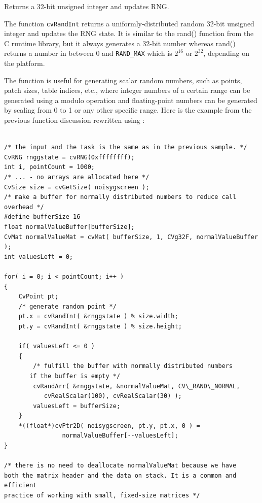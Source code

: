 \label{RandInt}

Returns a 32-bit unsigned integer and updates RNG.


\begin{description}
\end{description}

The function \texttt{cvRandInt} returns a uniformly-distributed random
32-bit unsigned integer and updates the RNG state. It is similar to the rand()
function from the C runtime library, but it always generates a 32-bit number
whereas rand() returns a number in between 0 and \texttt{RAND\_MAX}
which is $2^{16}$ or $2^{32}$, depending on the platform.

The function is useful for generating scalar random numbers, such as
points, patch sizes, table indices, etc., where integer numbers of a certain
range can be generated using a modulo operation and floating-point numbers
can be generated by scaling from 0 to 1 or any other specific range. Here
is the example from the previous function discussion rewritten using
:

\begin{lstlisting}

/* the input and the task is the same as in the previous sample. */
CvRNG rnggstate = cvRNG(0xffffffff);
int i, pointCount = 1000;
/* ... - no arrays are allocated here */
CvSize size = cvGetSize( noisygscreen );
/* make a buffer for normally distributed numbers to reduce call overhead */
#define bufferSize 16
float normalValueBuffer[bufferSize];
CvMat normalValueMat = cvMat( bufferSize, 1, CVg32F, normalValueBuffer );
int valuesLeft = 0;

for( i = 0; i < pointCount; i++ )
{
    CvPoint pt;
    /* generate random point */
    pt.x = cvRandInt( &rnggstate ) % size.width;
    pt.y = cvRandInt( &rnggstate ) % size.height;

    if( valuesLeft <= 0 )
    {
        /* fulfill the buffer with normally distributed numbers 
	   if the buffer is empty */
        cvRandArr( &rnggstate, &normalValueMat, CV\_RAND\_NORMAL, 
		   cvRealScalar(100), cvRealScalar(30) );
        valuesLeft = bufferSize;
    }
    *((float*)cvPtr2D( noisygscreen, pt.y, pt.x, 0 ) = 
				normalValueBuffer[--valuesLeft];
}

/* there is no need to deallocate normalValueMat because we have
both the matrix header and the data on stack. It is a common and efficient
practice of working with small, fixed-size matrices */

\end{lstlisting}

